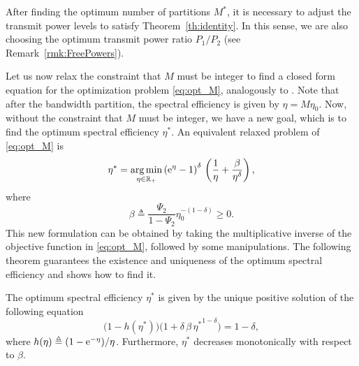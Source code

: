 After finding the optimum number of partitions $M^*$, it is necessary to adjust the transmit power levels to satisfy Theorem~\ref{th:identity}. In this sense, we are also choosing the optimum transmit power ratio $P_1/P_2$ (see Remark~\ref{rmk:FreePowers}).

Let us now relax the constraint that $M$ must be integer to find a closed form equation for the optimization problem \eqref{eq:opt_M}, analogously to \cite{jindal2008bandwidth}. Note that after the bandwidth partition, the spectral efficiency is given by $\eta = M\eta_0$. Now, without the constraint that $M$ must be integer, we have a new goal, which is to find the optimum spectral efficiency $\eta^*$. An equivalent relaxed problem of \eqref{eq:opt_M} is
\begin{equation} \label{eq:opt_eta}
	\eta^* = \operatorname*{arg\,min}_{\eta\in{\mathbb R}_+} \left(\mathrm{e}^\eta-1\right)^\delta\,
    \left( \dfrac{1}{\eta} + \dfrac{\beta}{\eta^\delta}\right),
\end{equation}
where 
\begin{equation}
\beta \triangleq \frac{\Psi_2}{1-\Psi_2}\eta_0^{-(1-\delta)} \ge 0. 
\end{equation}
This new formulation can be obtained by taking the multiplicative inverse of the objective function in \eqref{eq:opt_M}, followed by some manipulations. The following theorem guarantees the existence and uniqueness of the optimum spectral efficiency and shows how to find it.

\begin{theorem} \label{th:optimum_eta}
	The optimum spectral efficiency $\eta^*$ is given by the unique positive solution of the following equation
\begin{equation}\label{eq:Theor02}
	\big(1-h(\eta^*)\big) \big(1+\delta\,\beta\,{\eta^*}^{1-\delta}\big) = 1-\delta,
\end{equation}
	where $h(\eta) \triangleq (1-\mathrm{e}^{-\eta})/\eta$. Furthermore, $\eta^*$ decreases monotonically with respect to $\beta$.
\end{theorem}

